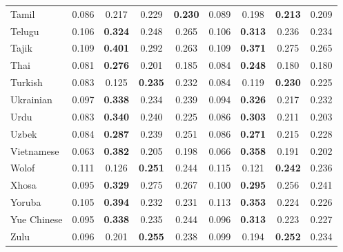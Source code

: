 \begin{longtable}{lcccccccc}
Tamil & 0.086 & 0.217 & 0.229 & \textbf{0.230} & 0.089 & 0.198 & \textbf{0.213} & 0.209 \\
Telugu & 0.106 & \textbf{0.324} & 0.248 & 0.265 & 0.106 & \textbf{0.313} & 0.236 & 0.234 \\
Tajik & 0.109 & \textbf{0.401} & 0.292 & 0.263 & 0.109 & \textbf{0.371} & 0.275 & 0.265 \\
Thai & 0.081 & \textbf{0.276} & 0.201 & 0.185 & 0.084 & \textbf{0.248} & 0.180 & 0.180 \\
Turkish & 0.083 & 0.125 & \textbf{0.235} & 0.232 & 0.084 & 0.119 & \textbf{0.230} & 0.225 \\
Ukrainian & 0.097 & \textbf{0.338} & 0.234 & 0.239 & 0.094 & \textbf{0.326} & 0.217 & 0.232 \\
Urdu & 0.083 & \textbf{0.340} & 0.240 & 0.225 & 0.086 & \textbf{0.303} & 0.211 & 0.203 \\
Uzbek & 0.084 & \textbf{0.287} & 0.239 & 0.251 & 0.086 & \textbf{0.271} & 0.215 & 0.228 \\
Vietnamese & 0.063 & \textbf{0.382} & 0.205 & 0.198 & 0.066 & \textbf{0.358} & 0.191 & 0.202 \\
Wolof & 0.111 & 0.126 & \textbf{0.251} & 0.244 & 0.115 & 0.121 & \textbf{0.242} & 0.236 \\
Xhosa & 0.095 & \textbf{0.329} & 0.275 & 0.267 & 0.100 & \textbf{0.295} & 0.256 & 0.241 \\
Yoruba & 0.105 & \textbf{0.394} & 0.232 & 0.231 & 0.113 & \textbf{0.353} & 0.224 & 0.226 \\
Yue Chinese & 0.095 & \textbf{0.338} & 0.235 & 0.244 & 0.096 & \textbf{0.313} & 0.223 & 0.227 \\
Zulu & 0.096 & 0.201 & \textbf{0.255} & 0.238 & 0.099 & 0.194 & \textbf{0.252} & 0.234 \\
\end{longtable}
\endgroup